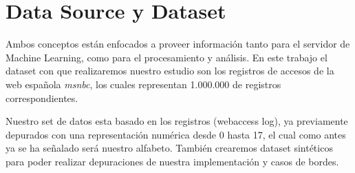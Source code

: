 \section{Data Source y Dataset }

	Ambos conceptos están enfocados a proveer información tanto para el servidor de Machine Learning, como para el procesamiento y análisis.
	En este trabajo el dataset con que realizaremos nuestro estudio son los registros de accesos de la web española \emph{msnbc}\cite{Claude2014}, los cuales representan 1.000.000 de registros correspondientes.

	Nuestro set de  datos esta basado en los registros (webaccess log), ya previamente depurados con una representación numérica desde 0 hasta 17, el cual como antes ya se ha señalado será nuestro alfabeto. También crearemos dataset sintéticos para poder realizar depuraciones de nuestra implementación y casos de bordes.
	
	 



 














